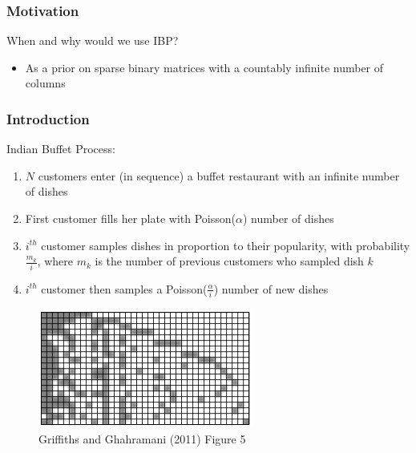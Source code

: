 \documentclass[13pt]{beamer}
\begin{document}
\begin{frame}
\frametitle{Motivation}

When and why would we use IBP?

\begin{itemize}
\item As a prior on sparse binary matrices with a countably infinite number of columns
\end{itemize}

\end{frame}
\begin{frame}
\frametitle{Introduction}

Indian Buffet Process:
\begin{enumerate}
\item $N$ customers enter (in sequence) a buffet restaurant with an infinite number of dishes
\item First customer fills her plate with Poisson($\alpha$) number of dishes
\item $i^{th}$ customer samples dishes in proportion to their popularity, with probability $\frac{m_k}{i}$, where $m_k$ is the number of previous customers who sampled dish $k$
\item $i^{th}$ customer then samples a Poisson($\frac{\alpha}{i}$) number of new dishes
\end{enumerate}

\begin{figure}
\begin{center}
\includegraphics[scale=0.5]{./img/ibp-sorted.png}
\caption{Griffiths and Ghahramani (2011) Figure 5}
\end{center}
\end{figure}

\end{frame}
\end{document}
